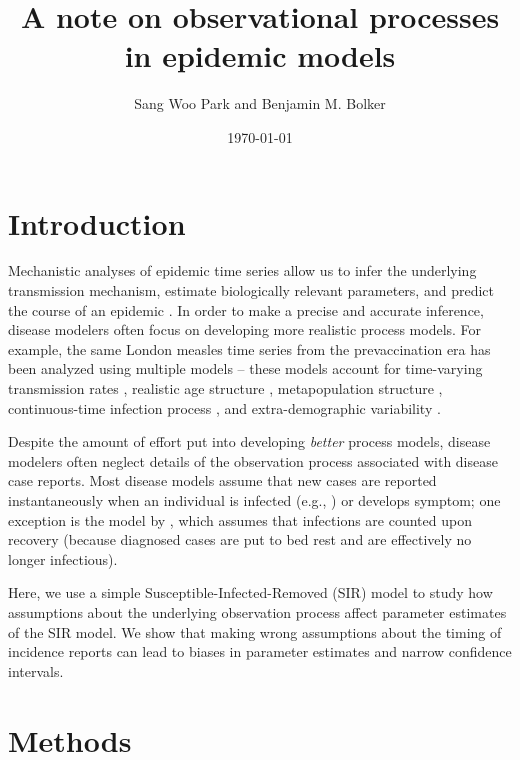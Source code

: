 \documentclass{article}\usepackage[]{graphicx}\usepackage[]{color}
\title{A note on observational processes in epidemic models}
\author{Sang Woo Park and Benjamin M. Bolker}
\date{\today}
\begin{document}
\maketitle

\section{Introduction}

Mechanistic analyses of epidemic time series allow us to infer the underlying 
transmission mechanism, estimate biologically relevant parameters, and 
predict the course of an epidemic \citep{breto2009time}. In order to make a 
precise and accurate inference, disease modelers often focus on developing
more realistic process models. For example, the same London measles time 
series from the prevaccination era has been analyzed using multiple models -- 
these models account for time-varying transmission rates \citep{fine1982measles}, 
realistic age structure \citep{schenzle1984age},
metapopulation structure \citep{xia2004measles}, continuous-time infection process 
\citep{cauchemez2008likelihood}, and extra-demographic variability \citep{he2009plug}. 

Despite the amount of effort put into developing \emph{better} process models, disease 
modelers often neglect details of the observation process associated with disease
case reports. Most disease models assume that new cases are reported
instantaneously when an individual is infected (e.g., \cite{martinez2016differential, 
kennedy2018modeling, pons2018serotype}) or develops symptom; one exception is
the model by \citep{he2009plug}, which assumes that infections are counted upon
recovery (because diagnosed cases are put to bed rest and are effectively 
no longer infectious). 

Here, we use a simple Susceptible-Infected-Removed (SIR) model to study how 
assumptions about the underlying observation process affect parameter estimates
of the SIR model. We show that making wrong assumptions about the timing of 
incidence reports can lead to biases in parameter estimates and narrow 
confidence intervals. 

\section{Methods}
\end{document}
